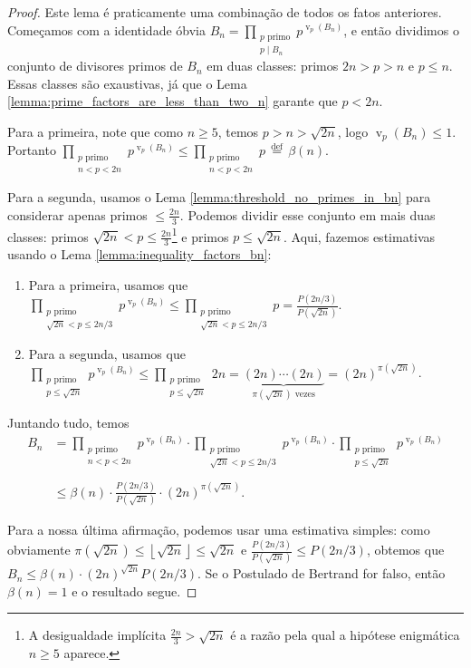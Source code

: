 \documentclass[11pt]{article}
\theoremstyle{remark}
\newcommand{\floor}[1]{\left\lfloor #1 \right\rfloor}
\newcommand{\vs}{\vspace{10px}}
\DeclareMathOperator{\val}{v}
\DeclareMathOperator{\vv}{v}
\begin{document}
\begin{proof}
Este lema é praticamente uma combinação de todos os fatos anteriores. Começamos com a identidade óbvia $B_n = \prod\limits_{\substack{p\text{ primo}\\p\mid B_n}} p^{\vv_p(B_n)}$, e então dividimos o conjunto de divisores primos de $B_n$ em duas classes: primos $2n>p >n$ e $p \le n$. Essas classes são exaustivas, já que o Lema \ref{lemma:prime_factors_are_less_than_two_n} garante que $p<2n$.\vs

Para a primeira, note que como $n\ge 5$, temos $p>n> \sqrt{2n}$, logo $\vv_p(B_n)\le 1$. Portanto $\prod\limits_{\substack{p\text{ primo }\\n<p<2n}}p^{\vv_p(B_n)}\le \prod\limits_{\substack{p\text{ primo }\\n<p<2n}}p\,\stackrel{\textrm{def}}{=}\, \beta(n)$.

Para a segunda, usamos o Lema \ref{lemma:threshold_no_primes_in_bn} para considerar apenas primos $\le \frac{2n}{3}$. Podemos dividir esse conjunto em mais duas classes: primos $\sqrt{2n}<p\le \frac{2n}{3}$\footnote{A desigualdade implícita $\frac{2n}{3}>\sqrt{2n}$ é a razão pela qual a hipótese enigmática $n\ge 5$ aparece.} e primos $p\le \sqrt{2n}$. Aqui, fazemos estimativas usando o Lema \ref{lemma:inequality_factors_bn}:

\begin{enumerate}
    \item Para a primeira, usamos que $\prod\limits_{\substack{p\text{ primo }\\ \sqrt{2n}<p \le 2n/3}} p^{\val_p(B_n)}\le \prod\limits_{\substack{p\text{ primo }\\ \sqrt{2n}<p \le 2n/3}} p = \frac{P(2n/3)}{P(\sqrt{2n})}$.
    \item Para a segunda, usamos que $\prod\limits_{\substack{p\text{ primo }\\p \le \sqrt{2n}}} p^{\val_p(B_n)}\le\prod\limits_{\substack{p\text{ primo }\\p \le \sqrt{2n}}}2n = \underbrace{(2n)\cdots (2n)}_{\pi(\sqrt{2n})\text{ vezes}} = (2n)^{\pi(\sqrt{2n})}$.
\end{enumerate}

Juntando tudo, temos 
    \begin{align*}
        B_n &= \prod\limits_{\substack{p\text{ primo }\\n<p<2n}}p^{\vv_p(B_n)}\cdot \prod\limits_{\substack{p\text{ primo }\\ \sqrt{2n}<p \le 2n/3}} p^{\val_p(B_n)}\cdot\prod_{\substack{p\text{ primo }\\p \le \sqrt{2n}}} p^{\val_p(B_n)}\\
        &\\
        &\le \beta(n)\cdot \frac{P(2n/3)}{P(\sqrt{2n})}\cdot  (2n)^{\pi(\sqrt{2n})}.
    \end{align*}
    
    Para a nossa última afirmação, podemos usar uma estimativa simples: como obviamente $\pi(\sqrt{2n})\le \floor{\sqrt{2n}}\le \sqrt{2n}$ e $ \frac{P(2n/3)}{P(\sqrt{2n})}\le P(2n/3)$, obtemos que $B_n \le \beta(n)\cdot (2n)^{\sqrt{2n}}P(2n/3)$. Se o Postulado de Bertrand for falso, então $\beta(n)=1$ e o resultado segue.
\end{proof}\vs
\end{document}
